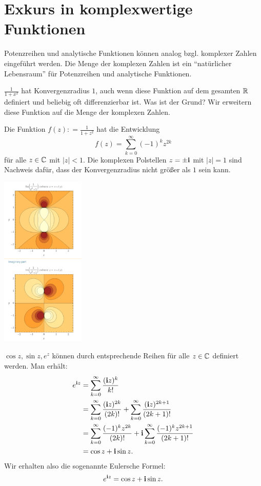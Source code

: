 \section{Exkurs in komplexwertige  Funktionen} 

\begin{bem} 
	Potenzreihen und analytische Funktionen können analog bzgl. komplexer Zahlen eingeführt werden. Die Menge der komplexen Zahlen ist ein ``natürlicher Lebensraum'' für Potenzreihen und analytische Funktionen. 
\end{bem} 

\begin{bsp} 
	$\frac{1}{1+ x^2}$ hat Konvergenzradius $1$, auch wenn diese Funktion auf dem gesamten $\mathbb{R}$ definiert und beliebig oft differenzierbar ist. Was ist der Grund? Wir erweitern diese Funktion auf die Menge der komplexen Zahlen.
	
	Die Funktion $f(z): = \frac{1}{1+z^2}$ hat die Entwicklung 
	\[
		f(z) = \sum_{k=0}^\infty (-1)^k z^{2 k}
	\]
	für alle $z \in \mathbb{C}$ mit $|z| < 1$.  Die komplexen Polstellen $z = \pm \mathbf{i}$ mit $|z|=1$ sind Nachweis dafür, dass der Konvergenzradius nicht größer als $1$ sein kann. 
	
	\begin{center} 
		\includegraphics[width=0.3\textwidth]{pics/WolframComplexPlot.png}
	\end{center} 
\end{bsp} 

\begin{bem}
	$\cos z, \sin z, e^z$ können durch entsprechende Reihen für alle $z \in \mathbb{C}$ definiert werden. Man erhält:  
	\begin{align*}
		e^{\mathbf{i} z} & = \sum_{k=0}^\infty \frac{ (\mathbf{i} z)^k }{k!} 
					\\ & =\sum_{k=0}^\infty \frac{ (\mathbf{i} z)^{2 k} }{(2 k)!}  + \sum_{k=0}^\infty \frac{ (\mathbf{i} z)^{2 k +1} }{(2 k+1)!} 
					\\ & = \sum_{k=0}^\infty \frac{ (-1)^k z^{2 k} }{(2 k)!}
					 + \mathbf{i} \sum_{k=0}^\infty \frac{(-1)^k z^{2 k +1}}{(2k+1)!}
					 \\ & = \cos z + \mathbf{i} \sin z. 
	\end{align*}
	Wir erhalten also die sogenannte Eulersche Formel:
	\[
		e^{\mathbf{i} z} = \cos z + \mathbf{i} \sin z. 
	\]
\end{bem} 


